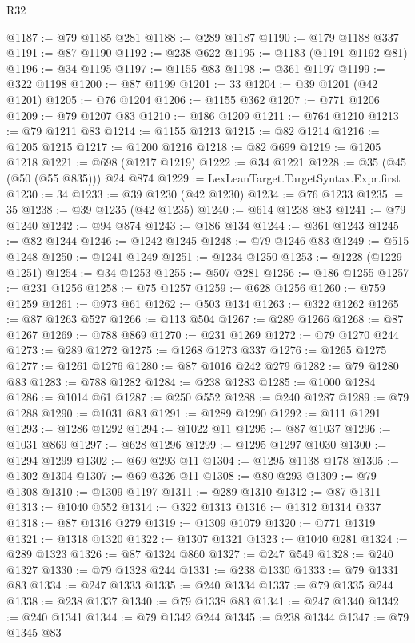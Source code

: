\begin{lexlean}{R32}
\begin{coremodule}
@1187 := @79 @1185 @281
@1188 := @289 @1187
@1190 := @179 @1188 @337
@1191 := @87 @1190
@1192 := @238 @622
@1195 := @1183 (@1191 @1192 @81)
@1196 := @34 @1195
@1197 := @1155 @83
@1198 := @361 @1197
@1199 := @322 @1198
@1200 := @87 @1199
@1201 := 33
@1204 := @39 @1201 (@42 @1201)
@1205 := @76 @1204
@1206 := @1155 @362
@1207 := @771 @1206
@1209 := @79 @1207 @83
@1210 := @186 @1209
@1211 := @764 @1210
@1213 := @79 @1211 @83
@1214 := @1155 @1213
@1215 := @82 @1214
@1216 := @1205 @1215
@1217 := @1200 @1216
@1218 := @82 @699
@1219 := @1205 @1218
@1221 := @698 (@1217 @1219)
@1222 := @34 @1221
@1228 := @35 (@45 (@50 (@55 @835))) @24 @874
@1229 := LexLeanTarget.TargetSyntax.Expr.first
@1230 := 34
@1233 := @39 @1230 (@42 @1230)
@1234 := @76 @1233
@1235 := 35
@1238 := @39 @1235 (@42 @1235)
@1240 := @614 @1238 @83
@1241 := @79 @1240
@1242 := @94 @874
@1243 := @186 @134
@1244 := @361 @1243
@1245 := @82 @1244
@1246 := @1242 @1245
@1248 := @79 @1246 @83
@1249 := @515 @1248
@1250 := @1241 @1249
@1251 := @1234 @1250
@1253 := @1228 (@1229 @1251)
@1254 := @34 @1253
@1255 := @507 @281
@1256 := @186 @1255
@1257 := @231 @1256
@1258 := @75 @1257
@1259 := @628 @1256
@1260 := @759 @1259
@1261 := @973 @61
@1262 := @503 @134
@1263 := @322 @1262
@1265 := @87 @1263 @527
@1266 := @113 @504
@1267 := @289 @1266
@1268 := @87 @1267
@1269 := @788 @869
@1270 := @231 @1269
@1272 := @79 @1270 @244
@1273 := @289 @1272
@1275 := @1268 @1273 @337
@1276 := @1265 @1275
@1277 := @1261 @1276
@1280 := @87 @1016 @242 @279
@1282 := @79 @1280 @83
@1283 := @788 @1282
@1284 := @238 @1283
@1285 := @1000 @1284
@1286 := @1014 @61
@1287 := @250 @552
@1288 := @240 @1287
@1289 := @79 @1288
@1290 := @1031 @83
@1291 := @1289 @1290
@1292 := @111 @1291
@1293 := @1286 @1292
@1294 := @1022 @11
@1295 := @87 @1037
@1296 := @1031 @869
@1297 := @628 @1296
@1299 := @1295 @1297 @1030
@1300 := @1294 @1299
@1302 := @69 @293 @11
@1304 := @1295 @1138 @178
@1305 := @1302 @1304
@1307 := @69 @326 @11
@1308 := @80 @293
@1309 := @79 @1308
@1310 := @1309 @1197
@1311 := @289 @1310
@1312 := @87 @1311
@1313 := @1040 @552
@1314 := @322 @1313
@1316 := @1312 @1314 @337
@1318 := @87 @1316 @279
@1319 := @1309 @1079
@1320 := @771 @1319
@1321 := @1318 @1320
@1322 := @1307 @1321
@1323 := @1040 @281
@1324 := @289 @1323
@1326 := @87 @1324 @860
@1327 := @247 @549
@1328 := @240 @1327
@1330 := @79 @1328 @244
@1331 := @238 @1330
@1333 := @79 @1331 @83
@1334 := @247 @1333
@1335 := @240 @1334
@1337 := @79 @1335 @244
@1338 := @238 @1337
@1340 := @79 @1338 @83
@1341 := @247 @1340
@1342 := @240 @1341
@1344 := @79 @1342 @244
@1345 := @238 @1344
@1347 := @79 @1345 @83

\end{coremodule}
\end{lexlean}
